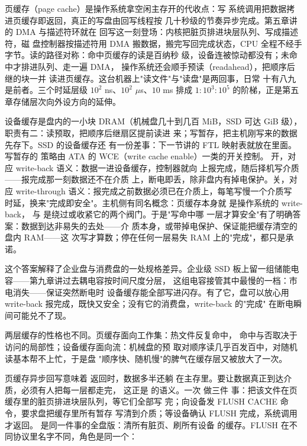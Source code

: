 页缓存（page cache）是操作系统拿空闲主存开的代收点：写
系统调用把数据拷进页缓存即返回，真正的写盘由回写线程按
几十秒级的节奏异步完成。第五章讲的 DMA 与描述符环就在
回写这一刻登场：内核把脏页排进块层队列、写成描述符，磁
盘控制器按描述符用 DMA 搬数据，搬完写回完成状态，CPU
全程不经手字节。读的路径对称：命中页缓存的读是百纳秒
级，设备连被惊动都没有；未命中才排进队列、走一遍 DMA，
操作系统还会顺手预读（readahead），把顺序后继的块一并
读进页缓存。这台机器上"读文件"与"读盘"是两回事，日常
十有八九是前者。三个时延层级 $10^{2}$ ns、$10^{2}$
$\mu$s、$10$ ms 排成 $1:10^{3}:10^{5}$ 的阶梯，正是第五
章存储层次向外设方向的延伸。

设备缓存是盘内的一小块 DRAM（机械盘几十到几百 MiB，SSD
可达 GiB 级），职责有二：读预取，把顺序后继扇区提前读进
来；写暂存，把主机刚写来的数据先存下。SSD 的设备缓存还
有一份差事：下一节讲的 FTL 映射表就放在里面。写暂存的
策略由 ATA 的 WCE（write cache enable）一类的开关控制。
开，对应 write-back 语义：数据一进设备缓存，控制器就向
上报完成，随后择机写介质——报完成那一刻数据还不在介质
上，断电即丢，除非盘内有掉电保护。关，对应 write-through
语义：报完成之前数据必须已在介质上，每笔写慢一个介质写
时延，换来"完成即安全"。主机侧有同名概念：页缓存本身就
是操作系统的 write-back， 与
 是绕过或收紧它的两个阀门。于是"写命中哪
一层才算安全"有了明确答案：数据到达非易失的去处——介
质本身，或带掉电保护、保证能把缓存清空的盘内 RAM——这
次写才算数；停在任何一层易失 RAM 上的"完成"，都只是承
诺。

这个答案解释了企业盘与消费盘的一处规格差异。企业级 SSD
板上留一组储能电容——第九章讲过去耦电容按时间尺度分层，
这组电容接管其中最慢的一档：市电消失——保证突然断电时
设备缓存能全部写进闪存。有了它，盘可以放心用 write-back
报完成，既快又安全；没有它的消费盘，write-back 的"完成"
在断电瞬间可能兑不了现。

两层缓存的性格也不同。页缓存面向工作集：热文件反复命中，
命中与否取决于访问的局部性；设备缓存面向流：机械盘的预
取对顺序读几乎百发百中，对随机读基本帮不上忙，于是盘
"顺序快、随机慢"的脾气在缓存层又被放大了一次。

页缓存异步回写意味着  返回时，数据多半还躺
在主存里。要让数据真正到达介质，必须有人把每一层都走完，
这正是  的语义。一次  做三件
事：把该文件在页缓存里的脏页排进块层队列，等它们全部写
完；向设备发 FLUSH CACHE 命令，要求盘把缓存里所有暂存
写清到介质；等设备确认 FLUSH 完成，系统调用才返回。
 是同一件事的全盘版：清所有脏页、刷所有设备
的缓存。FLUSH 在不同协议里名字不同，角色是同一个：

